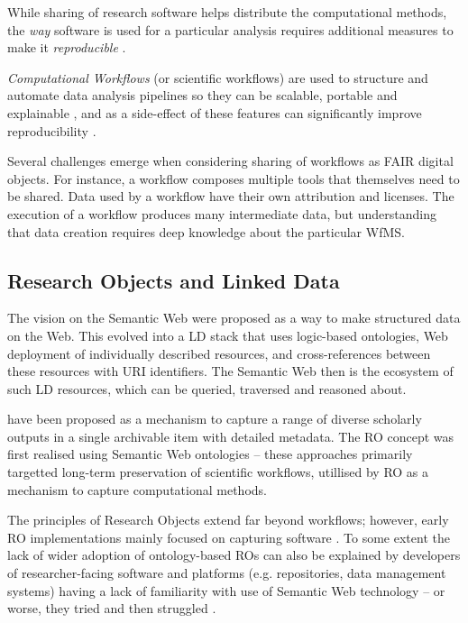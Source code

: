 While sharing of research software helps distribute the computational methods, the \emph{way} software is used for a particular analysis requires additional measures to make it \emph{reproducible} \cite{Stodden 2016,Sandve 2013}.

\emph{Computational Workflows} (or \glspl{scientific workflow}) are used to structure and automate data analysis pipelines so they can be scalable, portable and explainable \cite{Atkinson 2017}, and as a side-effect of these features can significantly improve reproducibility \cite{Cohen-Boulakia 2017}. 

Several challenges emerge when considering sharing of workflows as FAIR digital objects. For instance, a workflow composes multiple tools that themselves need to be shared. Data used by a workflow have their own attribution and licenses. The execution of a workflow produces many intermediate data, but understanding that data creation requires deep knowledge about the particular \acrfull{WfMS}.


\subsection{Research Objects and Linked Data}

The vision on the Semantic Web \cite{Berners-Lee 1999} were proposed as a way to make structured data on the Web. This evolved into a \acrfull{LD} stack that uses logic-based ontologies, Web deployment of individually described resources, and cross-references between these resources with \acrfull{URI} identifiers. The Semantic Web then is the ecosystem of such \acrlong{LD} resources, which can be queried, traversed and reasoned about. 

\cite{Bechhofer 2013} have been proposed as a mechanism to capture a range of diverse scholarly outputs in a single archivable item with detailed metadata. The RO concept was first realised using Semantic Web ontologies \cite{myExperiment 2009,Belhajjame 2015} -- these approaches primarily targetted long-term preservation of \glspl{scientific workflow}, utillised by RO as a mechanism to capture computational methods.

The principles of Research Objects extend far beyond workflows; however, early RO implementations mainly focused on capturing software \cite{Goble 2018}. To some extent the lack of wider adoption of ontology-based ROs can also be explained by developers of researcher-facing software and platforms (e.g. repositories, data management systems) having a lack of familiarity with use of Semantic Web technology -- or worse, they tried and then struggled \cite{Carriero 2010,Tudorache 2020}.

